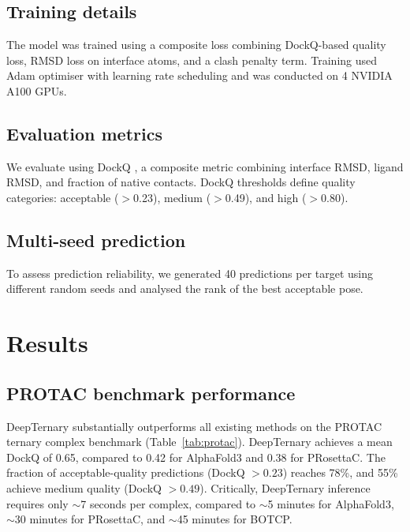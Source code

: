 \documentclass[11pt]{article}
\begin{document}
\subsection{Training details}
The model was trained using a composite loss combining DockQ-based quality loss, RMSD loss on interface atoms, and a clash penalty term. Training used Adam optimiser with learning rate scheduling and was conducted on 4 NVIDIA A100 GPUs.

\subsection{Evaluation metrics}
We evaluate using DockQ \citep{basu2016}, a composite metric combining interface RMSD, ligand RMSD, and fraction of native contacts. DockQ thresholds define quality categories: acceptable ($>$0.23), medium ($>$0.49), and high ($>$0.80).

\subsection{Multi-seed prediction}
To assess prediction reliability, we generated 40 predictions per target using different random seeds and analysed the rank of the best acceptable pose.

\section{Results}

\subsection{PROTAC benchmark performance}

DeepTernary substantially outperforms all existing methods on the PROTAC ternary complex benchmark (Table~\ref{tab:protac}). DeepTernary achieves a mean DockQ of 0.65, compared to 0.42 for AlphaFold3 and 0.38 for PRosettaC. The fraction of acceptable-quality predictions (DockQ $> 0.23$) reaches 78\%, and 55\% achieve medium quality (DockQ $> 0.49$). Critically, DeepTernary inference requires only $\sim$7 seconds per complex, compared to $\sim$5 minutes for AlphaFold3, $\sim$30 minutes for PRosettaC, and $\sim$45 minutes for BOTCP.
\end{document}
